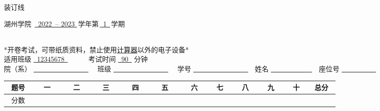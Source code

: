 \documentclass[twocolumn,landscape,UTF8]{article}
\newcommand{\putzdx}{\marginpar{
		\parbox{1cm}{\vspace{-2.5cm}         %
			\rotatebox[origin=c]{90}{        %
				\usebox{\zdx}
		}}
}}
\begin{document}
	\sbox{\zdx}
	{\parbox{27cm}{ 
			\dotfill{} 装\dotfill{}订\dotfill{}线\dotfill{} \\
	}}
	\reversemarginpar
	\setlength{\marginparsep}{1.0cm}
	\putzdx                            %
	\begin{center}
		\begin{LARGE}
			湖州学院~\underline{~2022~-- 2023 }\,学年第\,\underline{~1~}\,学期\\ 
			\vspace{2mm}{\bf 《XXXX》期末考试试卷}\\
		\end{LARGE}
		\vspace{2mm} *开卷考试，可带纸质资料，禁止使用\underline{计算器}以外的电子设备*\\
		\vspace{2mm}适用班级 \underline{~12345678~}~~~~~~考试时间 \underline{~90~} 分钟 \\
		\vspace{2mm}院（系） \underline{~~~~~~~~~~~~~~~~} ~~班级 \underline{~~~~~~~~~~~~~~~~} ~~学号 \underline{~~~~~~~~~~~~~~~~}~~姓名 \underline{~~~~~~~~~~~~}~~座位号 \underline{~~~~~~~~~~}
		\par
		\vspace{4mm}
		\begin{tabular}{|c|c|c|c|c|c|c|c|c|c|c|c|}
			\hline
			~题号~ & ~~一~~ & ~~二~~ & ~~三~~ & ~~四~~ & ~~五~~ & ~~六~ & ~~七~ & ~~八~ & ~~九~ & ~~十~ & ~总分~ \\
			\hline
			分数 &    &    &  & & & & & & & & \\
			\hline
		\end{tabular}
		
	\end{center}
	
	
\end{document}
